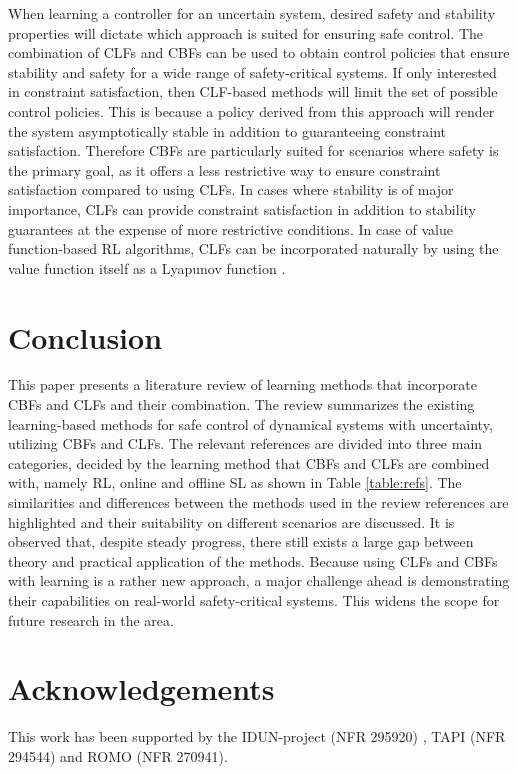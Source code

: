 \documentclass[3p,times,procedia]{elsarticle}
\begin{document}
When learning a controller for an uncertain system, desired safety and stability properties will dictate which approach is suited for ensuring safe control. The combination of CLFs and CBFs can be used to obtain control policies that ensure stability and safety for a wide range of safety-critical systems. If only interested in constraint satisfaction, then CLF-based methods will limit the set of possible control policies. This is because a policy derived from this approach will render the system asymptotically stable in addition to guaranteeing constraint satisfaction. Therefore CBFs are particularly suited for scenarios where safety is the primary goal, as it offers a less restrictive way to ensure constraint satisfaction compared to using CLFs. In cases where stability is of major importance, CLFs can provide constraint satisfaction in addition to stability guarantees at the expense of more restrictive conditions. In case of value function-based RL algorithms, CLFs can be incorporated naturally by using the value function itself as a Lyapunov function \cite{Berkenkamp2017}. 
 
\section{Conclusion}\label{conclusion}

This paper presents a literature review of learning methods that incorporate CBFs and CLFs and their combination. The review summarizes the existing learning-based methods for safe control of dynamical systems with uncertainty, utilizing CBFs and CLFs. The relevant references are divided into three main categories, decided by the learning method that CBFs and CLFs are combined with, namely RL, online and offline SL as shown in Table \ref{table:refs}. The similarities and differences between the methods used in the review references are highlighted and their suitability on different scenarios are discussed. It is observed that, despite steady progress, there still exists a large gap between theory and practical application of the methods. Because using CLFs and CBFs with learning is a rather new approach, a major challenge ahead is demonstrating their capabilities on real-world safety-critical systems. This widens the scope for future research in the area.

\section*{Acknowledgements}
This work has been supported by the IDUN-project (NFR 295920) , TAPI (NFR 294544) and ROMO (NFR 270941). 





\clearpage
\end{document}
